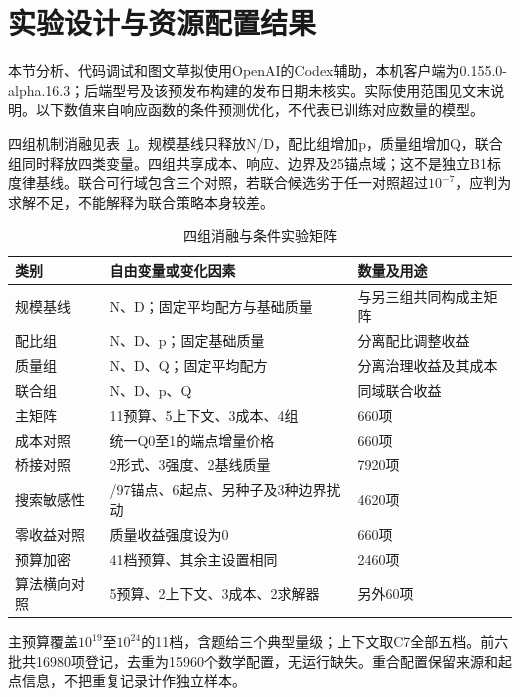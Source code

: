 \documentclass[UTF8,12pt,a4paper]{ctexart}
\begin{document}
\section{实验设计与资源配置结果}

本节分析、代码调试和图文草拟使用OpenAI的Codex辅助，本机客户端为0.155.0-alpha.16.3；后端型号及该预发布构建的发布日期未核实。实际使用范围见文末说明。以下数值来自响应函数的条件预测优化，不代表已训练对应数量的模型。


四组机制消融见表~\ref{tab:q3_5}。规模基线只释放N/D，配比组增加p，质量组增加Q，联合组同时释放四类变量。四组共享成本、响应、边界及25锚点域；这不是独立B1标度律基线。联合可行域包含三个对照，若联合候选劣于任一对照超过$10^{-7}$，应判为求解不足，不能解释为联合策略本身较差。


\begin{table}[htbp]\centering\setlength{\tabcolsep}{3pt}\renewcommand{\arraystretch}{1.12}
\caption{四组消融与条件实验矩阵}\label{tab:q3_5}
\begin{tabularx}{\textwidth}{>{\raggedright\arraybackslash}p{2.975132cm}>{\raggedright\arraybackslash}p{7.933686cm}>{\raggedright\arraybackslash}X}\toprule
类别 & 自由变量或变化因素 & 数量及用途 \\
\midrule
规模基线 & N、D；固定平均配方与基础质量 & 与另三组共同构成主矩阵 \\
配比组 & N、D、p；固定基础质量 & 分离配比调整收益 \\
质量组 & N、D、Q；固定平均配方 & 分离治理收益及其成本 \\
联合组 & N、D、p、Q & 同域联合收益 \\
主矩阵 & 11预算、5上下文、3成本、4组 & 660项 \\
成本对照 & 统一Q0至1的端点增量价格 & 660项 \\
桥接对照 & 2形式、3强度、2基线质量 & 7920项 \\
搜索敏感性 & 49/97锚点、6起点、另种子及3种边界扰动 & 4620项 \\
零收益对照 & 质量收益强度设为0 & 660项 \\
预算加密 & 41档预算、其余主设置相同 & 2460项 \\
算法横向对照 & 5预算、2上下文、3成本、2求解器 & 另外60项 \\
\bottomrule\end{tabularx}
\end{table}

\FloatBarrier

主预算覆盖$10^{19}$至$10^{24}$的11档，含题给三个典型量级；上下文取C7全部五档。前六批共16980项登记，去重为15960个数学配置，无运行缺失。重合配置保留来源和起点信息，不把重复记录计作独立样本。
\end{document}
